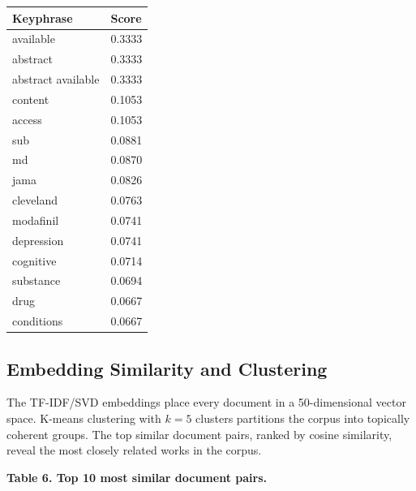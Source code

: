 \documentclass[
  english,
]{article}
\newcounter{none} %
\begin{document}
{\def\LTcaptype{none} %
\begin{longtable}[]{@{}ll@{}}
\toprule\noalign{}
Keyphrase & Score \\
\midrule\noalign{}
\endhead
\bottomrule\noalign{}
\endlastfoot
available & 0.3333 \\
abstract & 0.3333 \\
abstract available & 0.3333 \\
content & 0.1053 \\
access & 0.1053 \\
sub & 0.0881 \\
md & 0.0870 \\
jama & 0.0826 \\
cleveland & 0.0763 \\
modafinil & 0.0741 \\
depression & 0.0741 \\
cognitive & 0.0714 \\
substance & 0.0694 \\
drug & 0.0667 \\
conditions & 0.0667 \\
\end{longtable}
}

\subsection{Embedding Similarity and
Clustering}\label{embedding-similarity-and-clustering}

The TF-IDF/SVD embeddings place every document in a 50-dimensional
vector space. K-means clustering with \(k = 5\) clusters partitions the
corpus into topically coherent groups. The top similar document pairs,
ranked by cosine similarity, reveal the most closely related works in
the corpus.

\textbf{Table 6. Top 10 most similar document pairs.}
\end{document}
